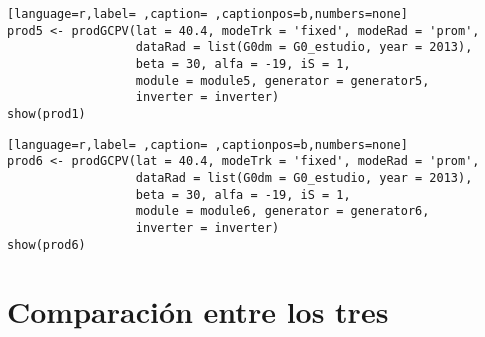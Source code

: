 \begin{lstlisting}[language=r,label= ,caption= ,captionpos=b,numbers=none]
prod5 <- prodGCPV(lat = 40.4, modeTrk = 'fixed', modeRad = 'prom',
                  dataRad = list(G0dm = G0_estudio, year = 2013),
                  beta = 30, alfa = -19, iS = 1,
                  module = module5, generator = generator5,
                  inverter = inverter)
show(prod1)
\end{lstlisting}
\begin{lstlisting}[language=r,label= ,caption= ,captionpos=b,numbers=none]
prod6 <- prodGCPV(lat = 40.4, modeTrk = 'fixed', modeRad = 'prom',
                  dataRad = list(G0dm = G0_estudio, year = 2013),
                  beta = 30, alfa = -19, iS = 1,
                  module = module6, generator = generator6,
                  inverter = inverter)
show(prod6)
\end{lstlisting}

\section{Comparación entre los tres}
\label{sec:org9cda98f}

